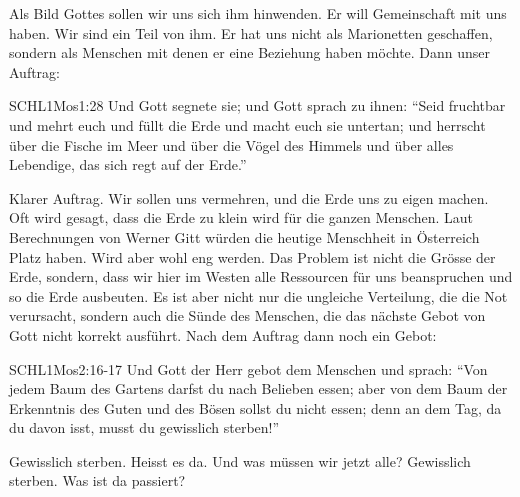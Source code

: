     Als Bild Gottes sollen wir uns sich ihm hinwenden. Er will Gemeinschaft mit uns haben. Wir sind ein Teil von ihm. Er hat uns nicht als Marionetten geschaffen, sondern als Menschen mit denen er eine Beziehung haben möchte. Dann unser Auftrag:
    \begin{bibelbox}{SCHL}{1Mos}{1:28}
        Und Gott segnete sie; und Gott sprach zu ihnen: \enquote{Seid fruchtbar und mehrt euch und füllt die Erde und macht euch sie untertan; und herrscht über die Fische im Meer und über die Vögel des Himmels und über alles Lebendige, das sich regt auf der Erde.}
    \end{bibelbox}
    Klarer Auftrag. Wir sollen uns vermehren, und die Erde uns zu eigen machen. Oft wird gesagt, dass die Erde zu klein wird für die ganzen Menschen. Laut Berechnungen von Werner Gitt würden die heutige Menschheit in Österreich Platz haben. Wird aber wohl eng werden. Das Problem ist nicht die Grösse der Erde, sondern, dass wir hier im Westen alle Ressourcen für uns beanspruchen und so die Erde ausbeuten. Es ist aber nicht nur die ungleiche Verteilung, die die Not verursacht, sondern auch die Sünde des Menschen, die das nächste Gebot von Gott nicht korrekt ausführt. Nach dem Auftrag dann noch ein Gebot:
    \begin{bibelbox}{SCHL}{1Mos}{2:16-17}
         Und Gott der Herr gebot dem Menschen und sprach: \enquote{Von jedem Baum des Gartens darfst du nach Belieben essen;  aber von dem Baum der Erkenntnis des Guten und des Bösen sollst du nicht essen; denn an dem Tag, da du davon isst, musst du gewisslich sterben!}
    \end{bibelbox}
    Gewisslich sterben. Heisst es da. Und was müssen wir jetzt alle? Gewisslich sterben. Was ist da passiert? 
 
